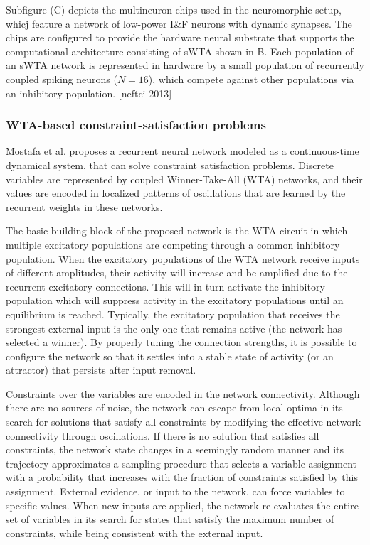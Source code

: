 \documentclass[main]{subfiles}
\begin{document}
 Subfigure (C) depicts the multineuron chips used in the neuromorphic setup, whicj feature a network of low-power I&F neurons with dynamic synapses. The chips are configured to provide the hardware neural substrate that supports the computational architecture consisting of sWTA shown in B. Each population of an sWTA network is represented in hardware by a small population of recurrently coupled spiking neurons ($N=16$), which compete against other populations via an inhibitory population. [neftci 2013]
\subsubsection{WTA-based constraint-satisfaction problems}

Mostafa et al. proposes a recurrent neural network modeled as a continuous-time dynamical system, that can solve constraint satisfaction problems. Discrete variables are represented by coupled Winner-Take-All (WTA) networks, and their values are encoded in localized patterns of oscillations that are learned by the recurrent weights in these networks.

The basic building block of the proposed network is the WTA circuit in which multiple excitatory populations are competing through a common inhibitory population. When the excitatory populations of the WTA network receive inputs of different amplitudes, their activity will increase and be amplified due to the recurrent excitatory connections. This will in turn activate the inhibitory population which will suppress activity in the excitatory populations until an equilibrium is reached. Typically, the excitatory population that receives the strongest external input is the only one that remains active (the network has selected a winner). By properly tuning the connection strengths, it is possible to configure the network so that it settles into a stable state of activity (or an attractor) that persists after input removal.

Constraints over the variables are encoded in the network connectivity. Although there are no sources of noise, the network can escape from local optima in its search for solutions that satisfy all constraints by modifying the effective network connectivity through oscillations. If there is no solution that satisfies all constraints, the network state changes in a seemingly random manner and its trajectory approximates a sampling procedure that selects a variable assignment with a probability that increases with the fraction of constraints satisfied by this assignment. External evidence, or input to the network, can force variables to specific values. When new inputs are applied, the network re-evaluates the entire
set of variables in its search for states that satisfy the maximum number of constraints, while being consistent with the external input.
\end{document}
